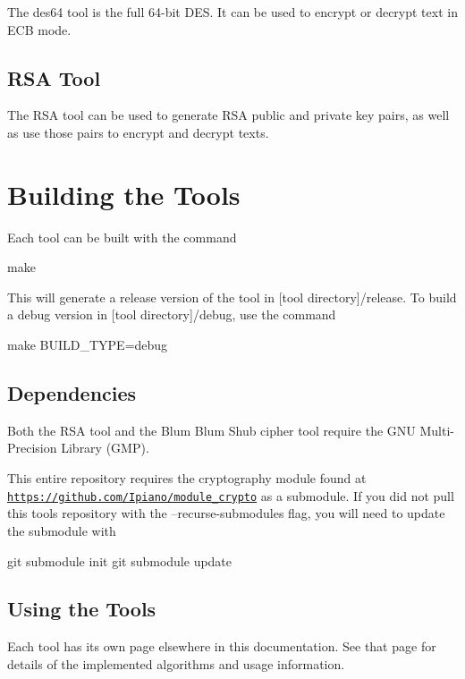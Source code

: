 The des64 tool is the full 64-\/bit D\+ES. It can be used to encrypt or decrypt text in E\+CB mode.\hypertarget{index_rsa_brief}{}\subsection{R\+S\+A Tool}\label{index_rsa_brief}
The R\+SA tool can be used to generate R\+SA public and private key pairs, as well as use those pairs to encrypt and decrypt texts.\hypertarget{index_compile_section}{}\section{Building the Tools}\label{index_compile_section}
Each tool can be built with the command \begin{DoxyVerb}make
\end{DoxyVerb}
 This will generate a release version of the tool in \mbox{[}tool directory\mbox{]}/release. To build a debug version in \mbox{[}tool directory\mbox{]}/debug, use the command \begin{DoxyVerb}make BUILD_TYPE=debug
\end{DoxyVerb}
\hypertarget{index_depend}{}\subsection{Dependencies}\label{index_depend}
Both the R\+SA tool and the Blum Blum Shub cipher tool require the G\+NU Multi-\/\+Precision Library (G\+MP).

This entire repository requires the cryptography module found at \href{https://github.com/Ipiano/module_crypto}{\tt https\+://github.\+com/\+Ipiano/module\+\_\+crypto} as a submodule. If you did not pull this tools repository with the --recurse-\/submodules flag, you will need to update the submodule with \begin{DoxyVerb}git submodule init
git submodule update
\end{DoxyVerb}
\hypertarget{index_usage}{}\subsection{Using the Tools}\label{index_usage}
Each tool has its own page elsewhere in this documentation. See that page for details of the implemented algorithms and usage information. 